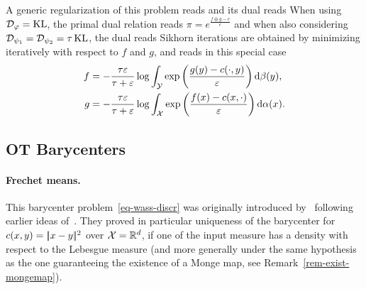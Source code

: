 A generic regularization of this problem reads
and its dual reads 
When using $\mathcal{D}_\varphi=\operatorname{KL}$, the primal dual relation reads $\pi=e^{\frac{f\oplus g - c}{\epsilon}}$ and when also considering $\mathcal{D}_{\psi_1}=\mathcal{D}_{\psi_2} = \tau \operatorname{KL}$, the dual reads
Sikhorn iterations are obtained by minimizing iteratively with respect to $f$ and $g$, and reads in this special case
\begin{align*}
	f &= -\frac{\tau\varepsilon}{\tau+\varepsilon} \log\int_{\mathcal{Y}} \exp\left(  \frac{g(y) - c(\cdot,y)}{\varepsilon}  \right)  \mathrm{d}\beta(y),  \\
	g &= -\frac{\tau\varepsilon}{\tau+\varepsilon} \log\int_{\mathcal{X}} \exp\left(  \frac{f(x) - c(x,\cdot)}{\varepsilon}  \right)  \mathrm{d}\alpha(x). \\
\end{align*}





\subsection{OT Barycenters}

\paragraph{Frechet means.}

This barycenter problem~\eqref{eq-wass-discr} was originally introduced by~\cite{Carlier_wasserstein_barycenter} following earlier ideas of~\cite{carlierekelandmatching}. They proved in particular uniqueness of the barycenter for $c(x,y)=|\!| x-y |\!|^2$ over $\mathcal{X}=\mathbb{R}^d$, if one of the input measure has a density with respect to the Lebesgue measure (and more generally under the same hypothesis as the one guaranteeing the existence of a Monge map, see Remark~\ref{rem-exist-mongemap}).

